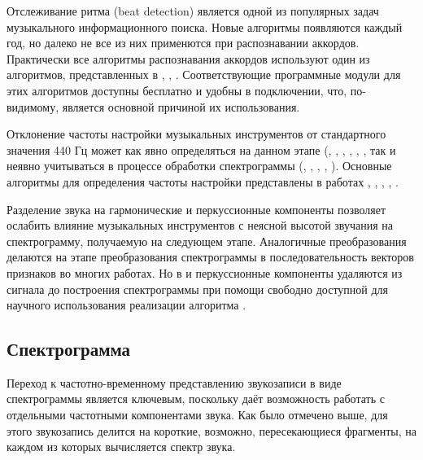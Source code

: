 Отслеживание ритма (beat detection) является одной из популярных задач
музыкального информационного поиска. Новые алгоритмы появляются каждый год, но
далеко не все из них применются при распознавании аккордов. Практически все
алгоритмы распознавания аккордов используют один из алгоритмов, представленных в
\cite{Davies2007}, \cite{Dixon2007}, \cite{Ellis2007}. Соответствующие
программные модули для этих алгоритмов доступны бесплатно и удобны в
подключении, что, по-видимому, является основной причиной их использования.

Отклонение частоты настройки музыкальных инструментов от стандартного значения
440 Гц может как явно определяться на данном этапе (\cite{Gomez2006},
\cite{Papadopoulos2007}, \cite{Khadkevich2009}, \cite{Khadkevich2011},
\cite{Ni2011}, \cite{Jiang2011}, так и неявно учитываться в процессе обработки
спектрограммы (\cite{Bello2005}, \cite{Lee2006}, \cite{Reed2009},
\cite{Mauch2010}, \cite{Rocher2010}). Основные алгоритмы для определения частоты
настройки представлены в работах \cite{Harte2005}, \cite{Zhu2005},
\cite{Gomez2006}, \cite{Peeters2006}, \cite{KhadkevichPhase2009}.

Разделение звука на гармонические и перкуссионные компоненты позволяет ослабить
влияние музыкальных инструментов с неясной высотой звучания на спектрограмму,
получаемую на следующем этапе. Аналогичные преобразования делаются на этапе
преобразования спектрограммы в последовательность векторов признаков во многих
работах. Но в \cite{Reed2009} и \cite{Ni2011} перкуссионные компоненты удаляются
из сигнала до построения спектрограммы при помощи свободно доступной для
научного использования реализации алгоритма \cite{Ono2008}.

\subsection{Спектрограмма} \label{ssectT_spect}

Переход к частотно-временному представлению звукозаписи в виде спектрограммы
является ключевым, поскольку даёт возможность работать с отдельными частотными
компонентами звука. Как было отмечено выше, для этого звукозапись делится на
короткие, возможно, пересекающиеся фрагменты, на каждом из которых вычисляется
спектр звука.

